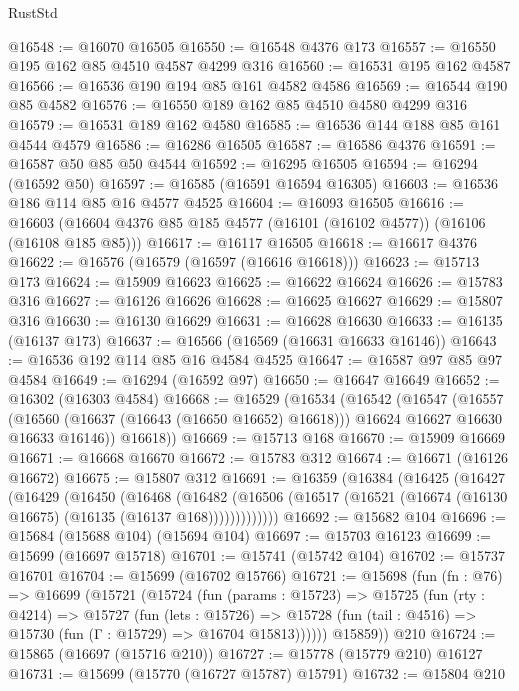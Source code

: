 \begin{lexlean}{RustStd}
\begin{coremodule}
@16548 := @16070 @16505
@16550 := @16548 @4376 @173
@16557 := @16550 @195 @162 @85 @4510 @4587 @4299 @316
@16560 := @16531 @195 @162 @4587
@16566 := @16536 @190 @194 @85 @161 @4582 @4586
@16569 := @16544 @190 @85 @4582
@16576 := @16550 @189 @162 @85 @4510 @4580 @4299 @316
@16579 := @16531 @189 @162 @4580
@16585 := @16536 @144 @188 @85 @161 @4544 @4579
@16586 := @16286 @16505
@16587 := @16586 @4376
@16591 := @16587 @50 @85 @50 @4544
@16592 := @16295 @16505
@16594 := @16294 (@16592 @50)
@16597 := @16585 (@16591 @16594 @16305)
@16603 := @16536 @186 @114 @85 @16 @4577 @4525
@16604 := @16093 @16505
@16616 := @16603 (@16604 @4376 @85 @185 @4577 (@16101 (@16102 @4577)) (@16106 (@16108 @185 @85)))
@16617 := @16117 @16505
@16618 := @16617 @4376
@16622 := @16576 (@16579 (@16597 (@16616 @16618)))
@16623 := @15713 @173
@16624 := @15909 @16623
@16625 := @16622 @16624
@16626 := @15783 @316
@16627 := @16126 @16626
@16628 := @16625 @16627
@16629 := @15807 @316
@16630 := @16130 @16629
@16631 := @16628 @16630
@16633 := @16135 (@16137 @173)
@16637 := @16566 (@16569 (@16631 @16633 @16146))
@16643 := @16536 @192 @114 @85 @16 @4584 @4525
@16647 := @16587 @97 @85 @97 @4584
@16649 := @16294 (@16592 @97)
@16650 := @16647 @16649
@16652 := @16302 (@16303 @4584)
@16668 := @16529
    (@16534
      (@16542
        (@16547
          (@16557
            (@16560 (@16637 (@16643 (@16650 @16652) @16618)))
            @16624
            @16627
            @16630
            @16633
            @16146))
        @16618))
@16669 := @15713 @168
@16670 := @15909 @16669
@16671 := @16668 @16670
@16672 := @15783 @312
@16674 := @16671 (@16126 @16672)
@16675 := @15807 @312
@16691 := @16359
    (@16384
      (@16425
        (@16427
          (@16429
            (@16450
              (@16468
                (@16482
                  (@16506 (@16517 (@16521 (@16674 (@16130 @16675) (@16135 (@16137 @168)))))))))))))
@16692 := @15682 @104
@16696 := @15684 (@15688 @104) (@15694 @104)
@16697 := @15703 @16123
@16699 := @15699 (@16697 @15718)
@16701 := @15741 (@15742 @104)
@16702 := @15737 @16701
@16704 := @15699 (@16702 @15766)
@16721 := @15698
    (fun (fn : @76) =>
    @16699
      (@15721
        (@15724
          (fun (params : @15723) =>
          @15725
            (fun (rty : @4214) =>
            @15727
              (fun (lets : @15726) =>
              @15728 (fun (tail : @4516) => @15730 (fun (Γ : @15729) => @16704 @15813))))))
        @15859))
    @210
@16724 := @15865 (@16697 (@15716 @210))
@16727 := @15778 (@15779 @210) @16127
@16731 := @15699 (@15770 (@16727 @15787) @15791)
@16732 := @15804 @210

\end{coremodule}
\end{lexlean}
